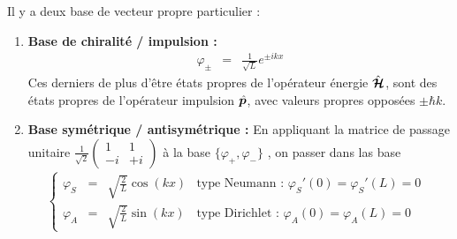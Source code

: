 \medskip
Il y a deux base de vecteur propre particulier : 
\begin{enumerate}[label=\roman*)]
	\item {\bf Base de chiralité / impulsion :}
	\begin{eqnarray}
		\varphi_\pm  & = & \displaystyle \frac{1}{\sqrt{L}} e^{\pm ikx} 
	\end{eqnarray}
	Ces derniers de plus d'être états propres de l’opérateur énergie $\hat{\bm{\mathcal{H}}}$, sont des états propres de l’opérateur impulsion $\hat{\bm{p}}$, avec valeurs propres opposées $\pm \hbar k$.
	\item {\bf Base symétrique / antisymétrique :} En appliquant la matrice de passage unitaire  $\frac{1}{\sqrt{2}}\left (\begin{matrix}1 & 1 \\ -i & + i\end{matrix}\right)$ à la base $\{ \varphi_+ , \varphi_- \}$ , on passer dans las base    
	\begin{eqnarray}
		\left \{ \begin{array}{rcllll} \varphi_S  & = & \displaystyle \sqrt{\frac{2}{L}} \cos (kx)  & \mbox{type Neumann  : $\varphi_S'(0) = \varphi_S'(L) = 0 $ } \\ \varphi_A   & = & \displaystyle \sqrt{\frac{2}{L}} \sin (kx)  & \mbox{type Dirichlet : $\varphi_A(0) = \varphi_A(L) = 0 $}\end{array} \right.
	\end{eqnarray}
\end{enumerate}


